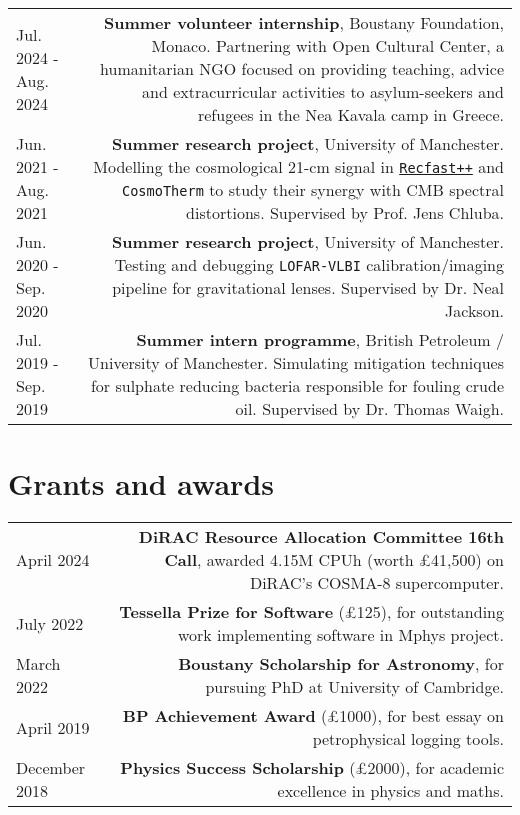 \documentclass{article}
\begin{document}
\begin{longtable}{L!{\vrule}R}
    Jul. 2024 - Aug. 2024 & \textbf{Summer volunteer internship}, Boustany Foundation, Monaco. Partnering with Open Cultural Center, a humanitarian NGO focused on providing teaching, advice and extracurricular activities to asylum-seekers and refugees in the Nea Kavala camp in Greece.  \\
    Jun. 2021 - Aug. 2021 & \textbf{Summer research project}, University of Manchester. Modelling the cosmological 21-cm signal in \href{https://bitbucket.org/Jacetoto/recfast-.vx/src/Recfast_JD_21cm_modelling/}{\texttt{Recfast++}} and \texttt{CosmoTherm} to study their synergy with CMB spectral distortions. Supervised by Prof. Jens Chluba. \\
    Jun. 2020 - Sep. 2020 & \textbf{Summer research project}, University of Manchester. Testing and debugging \texttt{LOFAR-VLBI} calibration/imaging pipeline for gravitational lenses. Supervised by Dr. Neal Jackson.\\
    Jul. 2019 - Sep. 2019 & \textbf{Summer intern programme}, British Petroleum / University of Manchester. Simulating mitigation techniques for sulphate reducing bacteria responsible for fouling crude oil. Supervised by Dr. Thomas Waigh. \\
\end{longtable}

\section*{Grants and awards}

\begin{longtable}{L!{\vrule}R}

    April 2024 & \textbf{DiRAC Resource Allocation Committee 16th Call}, awarded 4.15M CPUh (worth £41,500) on DiRAC's COSMA-8 supercomputer. \\
    July 2022 & \textbf{Tessella Prize for Software} (£125), for outstanding work implementing software in Mphys project. \\
    March 2022 & \textbf{Boustany Scholarship for Astronomy}, for pursuing PhD at University of Cambridge. \\
    April 2019 & \textbf{BP Achievement Award} (£1000), for best essay on petrophysical logging tools. \\
    December 2018 & \textbf{Physics Success Scholarship} (£2000), for academic excellence in physics and maths.\\

\end{longtable}
\end{document}
